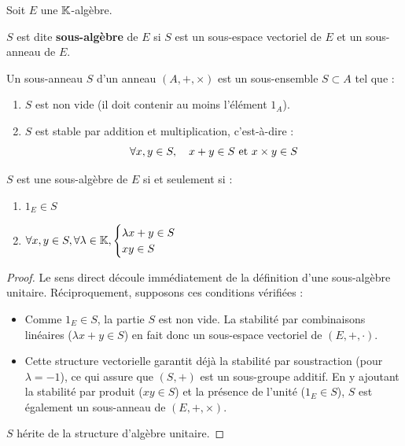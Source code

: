 \documentclass[11pt,a4paper]{report}
\begin{document}
\begin{definition}
    Soit $E$ une $\mathbb{K}$-algèbre.

    $S$ est dite \textbf{sous-algèbre} de $E$ si $S$ est un sous-espace vectoriel de $E$ et un sous-anneau de $E$.
\end{definition}

\begin{rappel}
    Un sous-anneau $S$ d'un anneau $(A,+,\times)$ est un sous-ensemble $S \subset A$ tel que :
    \begin{enumerate}
        \item $S$ est non vide (il doit contenir au moins l'élément $1_A$).
        \item $S$ est stable par addition et multiplication, c'est-à-dire :
        $$
            \forall x,y \in S, \quad x+y \in S \text{ et } x\times y \in S
        $$
    \end{enumerate}
\end{rappel}

\begin{property}
    $S$ est une sous-algèbre de $E$ si et seulement si :
    \begin{enumerate}
        \item $1_E \in S$
        \item $\forall x,y \in S, \forall \lambda \in \mathbb{K}, \begin{cases} \lambda x + y \in S \\ xy \in S\end{cases}$  
    \end{enumerate}
\end{property}

\begin{proof}
    Le sens direct découle immédiatement de la définition d'une sous-algèbre unitaire. Réciproquement, supposons ces conditions vérifiées :
    \begin{itemize}
        \item Comme $1_E \in S$, la partie $S$ est non vide. La stabilité par combinaisons linéaires ($\lambda x + y \in S$) en fait donc un sous-espace vectoriel de $(E,+,\cdot)$.
        \item Cette structure vectorielle garantit déjà la stabilité par soustraction (pour $\lambda = -1$), ce qui assure que $(S,+)$ est un sous-groupe additif. En y ajoutant la stabilité par produit ($xy \in S$) et la présence de l'unité ($1_E \in S$), $S$ est également un sous-anneau de $(E,+,\times)$.
    \end{itemize}
    $S$ hérite de la structure d'algèbre unitaire.
\end{proof}
\end{document}
